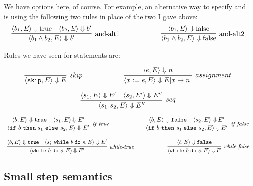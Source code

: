\documentclass[11pt]{article}
\begin{document}
We have options here, of course.  For example, an alternative way to specify and is using the following two rules in place of the two I gave above:
\[
\begin{array}{lcr}
\infer[$and-alt1$]{\langle b_1 \wedge b_2, E \rangle \Downarrow b'} {\langle b_1, E \rangle \Downarrow \mbox{true} & \langle b_2, E \rangle \Downarrow b' }
&~~~~~~~~~~~~&
\infer[$and-alt2$]{\langle b_1 \wedge b_2, E \rangle \Downarrow \mbox{false}} {\langle b_1, E \rangle \Downarrow \mbox{false}}
\end{array}
\]


\noindent Rules we have seen  for statements are:



\[
\begin{array}{llr}
\infer[skip]{\langle \mathtt{skip}, E \rangle \Downarrow E}{}
&~~~~~~~~~~~~&
\infer[assignment]{\langle x := e, E\rangle \Downarrow E[x \mapsto n]} {\langle e, E\rangle \Downarrow n} 
\end{array}
\]


\[
\infer[seq]{\langle s_1 ; s_2, E\rangle \Downarrow E''}{\langle s_1,E\rangle \Downarrow E'
  ~~~ \langle s_2, E' \rangle \Downarrow E''}
\]

\[
\begin{array}{llr}

\infer[$\textit{if-true}$]{\langle \mathtt{if}~b~\mathtt{then}~s_1~\mathtt{else}~s_2, E\rangle  \Downarrow
  E'}{\langle b, E\rangle \Downarrow \mathtt{true} & \langle s_1, E\rangle \Downarrow
  E'}
&~~~~~~~~~~~~&
\infer[$\textit{if-false}$]{\langle \mathtt{if}~b~\mathtt{then}~s_1~\mathtt{else}~s_2, E \rangle \Downarrow
  E'}{\langle b, E\rangle \Downarrow \mathtt{false} & \langle s_2, E\rangle \Downarrow
  E'}
  \end{array}
\]

\[
\begin{array}{llr}

\infer[$\textit{while-true}$]{\langle \mathtt{while}~b~\mathtt{do}~s, E \rangle \Downarrow
  E'}{\langle b, E\rangle \Downarrow \mathtt{true} & \langle s;~\mathtt{while}~b~\mathtt{do}~s, E \rangle \Downarrow E'}
  &~~~~~~~~~~~~&

\infer[$\textit{while-false}$]{\langle \mathtt{while}~b~\mathtt{do}~s, E \rangle \Downarrow
  E}{\langle b, E\rangle \Downarrow \mathtt{false}}
\end{array}
\]

\subsection{Small step semantics}
\end{document}
